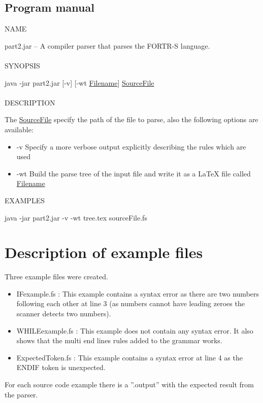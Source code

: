 \documentclass{article}
\begin{document}
\subsection{Program manual}
\noindent NAME

part2.jar -- A compiler parser that parses the FORTR-S language.
\\\\
\noindent SYNOPSIS

java -jar part2.jar [-v] [-wt \underline{Filename}]  \underline{SourceFile}
\\\\
\noindent DESCRIPTION

The \underline{SourceFile} specify the path of the file to parse, also the following options are available:
\begin{itemize}
    \item[] -v \hspace{3pt} Specify a more verbose output explicitly describing the rules which are used
    \item[] -wt Build the parse tree of the input file and write it as a LaTeX file called \underline{Filename}

\end{itemize}

\noindent EXAMPLES

java -jar part2.jar -v -wt tree.tex sourceFile.fs

\section{Description of example files}
Three example files were created.

\begin{itemize}
    \item IFexample.fs : This example contains a syntax error as there are two numbers following each other at line 3 (as numbers cannot have leading zeroes the scanner detects two numbers).
    \item WHILEexample.fs : This example does not contain any syntax error. It also shows that the multi end lines rules added to the grammar works.
    \item ExpectedToken.fs : This example contains a syntax error at line 4 as the ENDIF token is unexpected.
\end{itemize}

For each source code example there is a ”.output” with the expected result from the parser.
\end{document}
